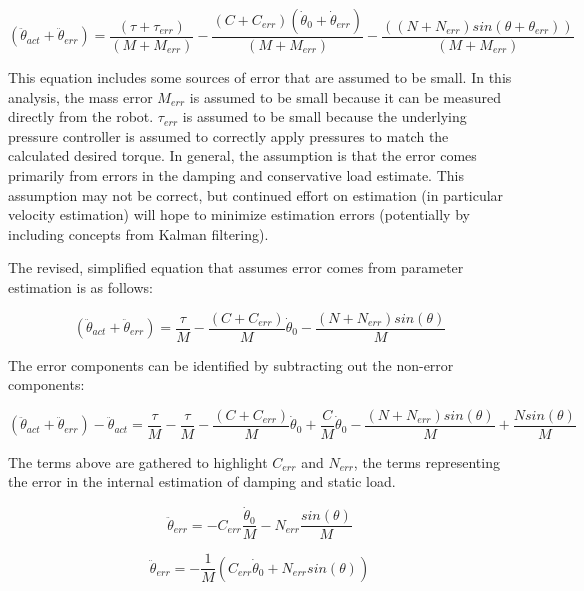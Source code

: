 \begin{equation}
(\ddot{\theta}_{act} + \ddot{\theta}_{err}) = \dfrac{(\tau + \tau_{err})}{(M + M_{err})} - \dfrac{(C + C_{err}) (\dot{\theta}_{0} + \dot{\theta}_{err})}{(M + M_{err})} - \dfrac{((N + N_{err})sin(\theta + \theta_{err}))}{(M + M_{err})}
\end{equation}

This equation includes some sources of error that are assumed to be small. In 
this analysis, the mass error $M_{err}$ is assumed to be small because it can
be measured directly from the robot. $\tau_{err}$ is assumed to be small because
the underlying pressure controller is assumed to correctly apply pressures to
match the calculated desired torque. In general, the assumption is that the error
comes primarily from errors in the damping and conservative load estimate. This 
assumption may not be correct, but continued effort on estimation (in particular 
velocity estimation) will hope to minimize estimation errors (potentially by 
including concepts from Kalman filtering).

The revised, simplified equation that assumes error comes from parameter estimation is as follows:

\begin{equation}
(\ddot{\theta}_{act} + \ddot{\theta}_{err}) = \dfrac{\tau}{M} - \dfrac{(C + C_{err})}{M}\dot{\theta}_{0} - \dfrac{(N + N_{err})sin(\theta)}{M}
\end{equation}

The error components can be identified by subtracting out the non-error 
components:

\begin{equation}
(\ddot{\theta}_{act} + \ddot{\theta}_{err}) - \ddot{\theta}_{act} =
\dfrac{\tau}{M} - \dfrac{\tau}{M}
- \dfrac{(C + C_{err})}{M}\dot{\theta}_{0} + \dfrac{C}{M}\dot{\theta}_{0}
- \dfrac{(N + N_{err})sin(\theta)}{M}  + \dfrac{N sin(\theta)}{M}
\end{equation}

The terms above are gathered to highlight $C_{err}$ and $N_{err}$, the terms representing the error in the internal estimation of damping and static load.

\begin{equation}
\ddot{\theta}_{err} =
- C_{err} \dfrac{\dot{\theta}_{0}}{M}
- N_{err} \dfrac{sin(\theta)}{M}
\end{equation}

\begin{equation}
\ddot{\theta}_{err} = - \dfrac{1}{M}
(C_{err} \dot{\theta}_{0} + N_{err} sin(\theta))
\end{equation}

